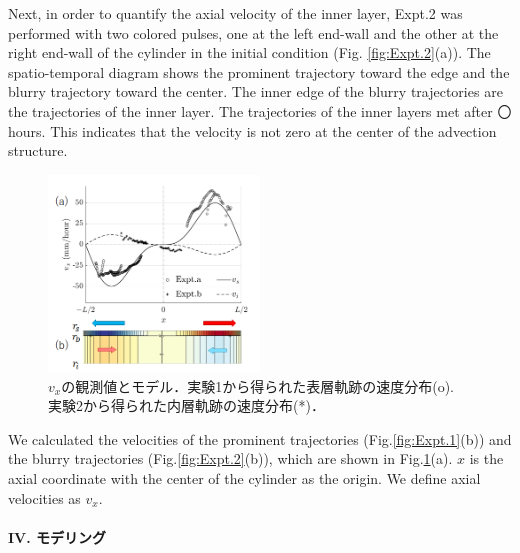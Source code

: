 \documentclass[prl,twocolumn,superscriptaddress]{revtex4}
\begin{document}
Next, in order to quantify the axial velocity of the inner layer, Expt.2 was performed with two colored pulses, one at the left end-wall and the other at the right end-wall of the cylinder in the initial condition (Fig. \ref{fig:Expt.2}(a)). The spatio-temporal diagram shows the prominent trajectory toward the edge and the blurry trajectory toward the center. The inner edge of the blurry trajectories are the trajectories of the inner layer. The trajectories of the inner layers met after 〇 hours. This indicates that the velocity is not zero at the center of the advection structure.
\begin{figure}[tb]
	\centering
	\includegraphics[width=0.5\textwidth]{figure/observed_and_model_vx.png}
	\caption{$v_x$の観測値とモデル．実験1から得られた表層軌跡の速度分布(o). 実験2から得られた内層軌跡の速度分布(*)．}
	\label{fig:profile_model_vx}
\end{figure}
We calculated the velocities of the prominent trajectories (Fig.\ref{fig:Expt.1}(b)) and the blurry trajectories (Fig.\ref{fig:Expt.2}(b)), which are shown in Fig.\ref{fig:profile_model_vx}(a). $x$ is the axial coordinate with the center of the cylinder as the origin. We define axial velocities as $v_x$. \\
\\
{\bf I\hspace{-.1em}V. モデリング} \\
 \\
\end{document}
